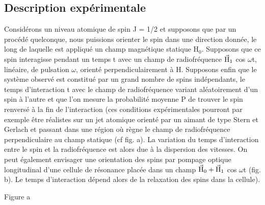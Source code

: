 \subsection{Description expérimentale}%
Considérons un niveau atomique de spin J = 1/2 et supposons que
par un procédé quelconque, nous puissions orienter le spin dans une direction donnée,
le long de laquelle est appliqué un champ magnétique statique
H$_0$. Supposons que ce spin interagisse pendant un temps t avec un champ de
radiofréquence $\vec{\text{H}}_1$ cos $\omega$t, linéaire, de pulsation $\omega$, orienté perpendiculairement
à H. Supposons enfin que le système observé est constitué par un
grand nombre de spins indépendants, le temps d'interaction t avec le champ
de radiofréquence variant aléatoirement d'un spin à l'autre et que l'on mesure
la probabilité moyenne P de trouver le spin renversé à la fin de l'interaction
(ces conditions expérimentales pourront par exemple être réalistes
sur un jet atomique orienté par un aimant de type Stern et Gerlach et passant
dans une région où règne le champ de radiofréquence perpendiculaire au champ
statique (cf fig. a). La variation du temps d'interaction entre le spin et
la radiofréquence est alors due à la dispersion des vitesses. On peut également envisager
une orientation des spins par pompage optique longitudinal
d'une cellule de résonance placée dans un champ $\vec{\text{H}}_0+\vec{\text{H}}_1$ cos $\omega$t (fig. b). Le
temps d'interaction dépend alors de la relaxation des spins dans la cellule).
\begin{minipage}[c]{.6\linewidth}
\begin{center} 

Figure a
\end{center}
\end{minipage}
